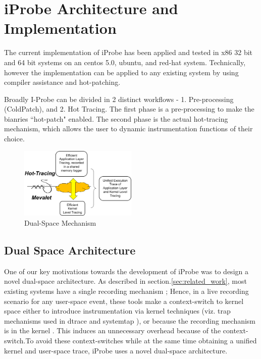 
\section{iProbe Architecture and Implementation}
\label{sec:implementation}

The current implementation of iProbe has been applied and tested in x86 32 bit and 64 bit systems on an centos 5.0, ubuntu, and red-hat system. Technically, however the implementation can be applied to any existing system by using compiler assistance and hot-patching.

Broadly I-Probe can be divided in 2 distinct workflows - 1. Pre-processing (ColdPatch), and 2. Hot Tracing. 
The first phase is a pre-processing to make the bianries ``hot-patch" enabled. The second phase is the actual hot-tracing mechanism, which allows the user to dynamic instrumentation functions of their choice.
\\

\begin{figure}[htb]
  \begin{center}
  \includegraphics[width=0.5\textwidth]{Images/Dual-Space.eps}
  \caption{Dual-Space Mechanism}
  \label{fig:dualspace}
 \end{center}
\end{figure}

\subsection{Dual Space Architecture}
\label{dualspace}

One of our key motivations towards the development of iProbe was to design a novel dual-space architecture. As described in section.\ref{sec:related_work}, most existing systems have a single recording mechanism \cite{dtrace,systemtap,fay,lttng} ; Hence, in a live recording scenario for any user-space event, these tools make a context-switch to kernel space either to introduce instrumentation via kernel techniques (viz. trap mechanisms used in dtrace and systemtap \cite{dtrace,systemtap}), or because the recording mechanism is in the kernel \cite{fay}. This induces an unnecessary overhead because of the context-switch.To avoid these context-switches while at the same time obtaining a unified kernel and user-space trace, iProbe uses a novel dual-space architecture.  

